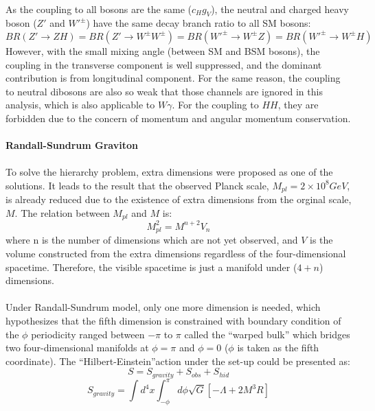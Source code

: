 \\As the coupling to all bosons are the same ($c_{H}g_{V}$), the neutral and charged heavy boson ($Z'$ and $W'^{\pm}$) have the same decay branch ratio to all SM bosons:
\begin{equation}
BR(Z'\rightarrow ZH) = BR(Z'\rightarrow W^\pm W^\pm) = BR(W'^\pm \rightarrow W^\pm Z) = BR(W'^\pm \rightarrow W^\pm H)
\end{equation}
However, with the small mixing angle (between SM and BSM bosons), the coupling in the transverse component is well suppressed, and the dominant contribution is from longitudinal component. For the same reason, the coupling to neutral dibosons are also so weak that those channels are ignored in this analysis, which is also applicable to $W\gamma$.  For the coupling to $HH$, they are forbidden due to the concern of momentum and angular momentum conservation. 
\\
\\{\bf Randall-Sundrum Graviton}
\\
\\To solve the hierarchy problem, extra dimensions were proposed as one of the solutions. It leads to the result that the observed Planck scale, $M_{pl}=2\times10^8GeV$, is already reduced due to the existence of extra dimensions from the orginal scale, $M$. The relation between $M_{pl}$ and $M$ is: 
\begin{equation}
\label{Eq:planck_relation}
M_{pl}^{2} = M^{n+2}V_{n}
\end{equation}
where n is the number of dimensions which are not yet observed, and $V$ is the volume constructed from the extra dimensions regardless of the four-dimensional spacetime. Therefore, the visible spacetime is just a manifold under ($4+n$) dimensions.
\\ 
\\Under Randall-Sundrum model, only one more dimension is needed, which hypothesizes that the fifth dimension is constrained with boundary condition of the $\phi$ periodicity ranged between $-\pi$ to $\pi$ called the ``warped bulk'' which bridges two four-dimensional manifolds at $\phi=\pi$  and $\phi=0$ ($\phi$ is taken as the fifth coordinate). The ``Hilbert-Einstein''action under the set-up could be presented as:
\begin{equation}
S = S_{gravity} +S_{obs} + S_{hid}
\end{equation}
\begin{equation}
S_{gravity} = \int d^4x \int^{\pi}_{-\phi}d\phi\sqrt{G}\left[-\Lambda +2M^3R\right]
\end{equation}
